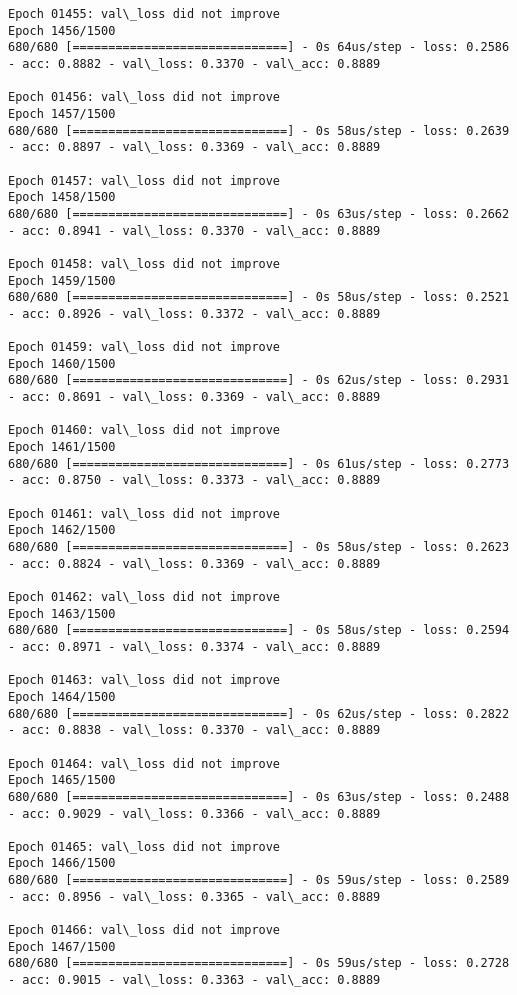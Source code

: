 \documentclass[11pt]{article}
\begin{document}
\begin{Verbatim}[commandchars=\\\{\}]
Epoch 01455: val\_loss did not improve
Epoch 1456/1500
680/680 [==============================] - 0s 64us/step - loss: 0.2586 - acc: 0.8882 - val\_loss: 0.3370 - val\_acc: 0.8889

Epoch 01456: val\_loss did not improve
Epoch 1457/1500
680/680 [==============================] - 0s 58us/step - loss: 0.2639 - acc: 0.8897 - val\_loss: 0.3369 - val\_acc: 0.8889

Epoch 01457: val\_loss did not improve
Epoch 1458/1500
680/680 [==============================] - 0s 63us/step - loss: 0.2662 - acc: 0.8941 - val\_loss: 0.3370 - val\_acc: 0.8889

Epoch 01458: val\_loss did not improve
Epoch 1459/1500
680/680 [==============================] - 0s 58us/step - loss: 0.2521 - acc: 0.8926 - val\_loss: 0.3372 - val\_acc: 0.8889

Epoch 01459: val\_loss did not improve
Epoch 1460/1500
680/680 [==============================] - 0s 62us/step - loss: 0.2931 - acc: 0.8691 - val\_loss: 0.3369 - val\_acc: 0.8889

Epoch 01460: val\_loss did not improve
Epoch 1461/1500
680/680 [==============================] - 0s 61us/step - loss: 0.2773 - acc: 0.8750 - val\_loss: 0.3373 - val\_acc: 0.8889

Epoch 01461: val\_loss did not improve
Epoch 1462/1500
680/680 [==============================] - 0s 58us/step - loss: 0.2623 - acc: 0.8824 - val\_loss: 0.3369 - val\_acc: 0.8889

Epoch 01462: val\_loss did not improve
Epoch 1463/1500
680/680 [==============================] - 0s 58us/step - loss: 0.2594 - acc: 0.8971 - val\_loss: 0.3374 - val\_acc: 0.8889

Epoch 01463: val\_loss did not improve
Epoch 1464/1500
680/680 [==============================] - 0s 62us/step - loss: 0.2822 - acc: 0.8838 - val\_loss: 0.3370 - val\_acc: 0.8889

Epoch 01464: val\_loss did not improve
Epoch 1465/1500
680/680 [==============================] - 0s 63us/step - loss: 0.2488 - acc: 0.9029 - val\_loss: 0.3366 - val\_acc: 0.8889

Epoch 01465: val\_loss did not improve
Epoch 1466/1500
680/680 [==============================] - 0s 59us/step - loss: 0.2589 - acc: 0.8956 - val\_loss: 0.3365 - val\_acc: 0.8889

Epoch 01466: val\_loss did not improve
Epoch 1467/1500
680/680 [==============================] - 0s 59us/step - loss: 0.2728 - acc: 0.9015 - val\_loss: 0.3363 - val\_acc: 0.8889


\end{Verbatim}
\end{document}
